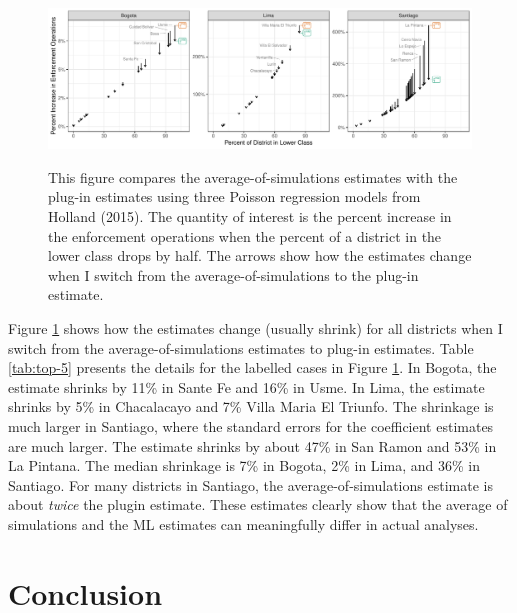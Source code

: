 \documentclass[12pt]{article}
\begin{document}
\begin{figure}[h]
\begin{center}
\includegraphics[width=\textwidth]{figs/holland.pdf}\\
\vspace{.1in}
\caption{This figure compares the average-of-simulations estimates with the plug-in estimates using three Poisson regression models from Holland (2015). The quantity of interest is the percent increase in the enforcement operations when the percent of a district in the lower class drops by half. The arrows show how the estimates change when I switch from the average-of-simulations to the plug-in estimate.}\label{fig:holland}
\end{center}
\end{figure}

Figure \ref{fig:holland} shows how the estimates change (usually shrink) for all districts when I switch from the average-of-simulations estimates to plug-in estimates. Table \ref{tab:top-5} presents the details for the labelled cases in Figure \ref{fig:holland}. In Bogota, the estimate shrinks by 11\% in Sante Fe and 16\% in Usme. In Lima, the estimate shrinks by 5\% in Chacalacayo and 7\% Villa Maria El Triunfo. The shrinkage is much larger in Santiago, where the standard errors for the coefficient estimates are much larger. The estimate shrinks by about 47\% in San Ramon and 53\% in La Pintana. The median shrinkage is 7\% in Bogota, 2\% in Lima, and 36\% in Santiago. For many districts in Santiago, the average-of-simulations estimate is about \textit{twice} the plugin estimate. These estimates clearly show that the average of simulations and the ML estimates can meaningfully differ in actual analyses.



\section*{Conclusion}
\end{document}
